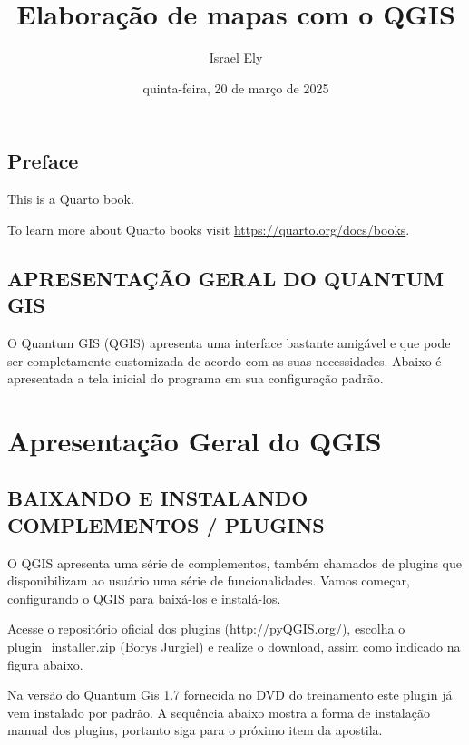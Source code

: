 \documentclass[
  11pt,
  a4paper,
]{book}
\title{Elaboração de mapas com o QGIS}
\author{Israel Ely}
\date{quinta-feira, 20 de março de 2025}
\renewcommand*\contentsname{Índice}
\newcommand\contentsname{Índice}
\begin{document}
\frontmatter
\maketitle

\renewcommand*\contentsname{Índice}
{
\hypersetup{linkcolor=}
\setcounter{tocdepth}{2}
\tableofcontents
}

\mainmatter
{}

\chapter*{Preface}\label{preface}


This is a Quarto book.

To learn more about Quarto books visit
\url{https://quarto.org/docs/books}.


\chapter{APRESENTAÇÃO GERAL DO QUANTUM
GIS}\label{apresentauxe7uxe3o-geral-do-quantum-gis}

O Quantum GIS (QGIS) apresenta uma interface bastante amigável e que
pode ser completamente customizada de acordo com as suas necessidades.
Abaixo é apresentada a tela inicial do programa em sua configuração
padrão.

\part{Apresentação Geral do QGIS}

\chapter{BAIXANDO E INSTALANDO COMPLEMENTOS /
PLUGINS}\label{baixando-e-instalando-complementos-plugins}

O QGIS apresenta uma série de complementos, também chamados de plugins
que disponibilizam ao usuário uma série de funcionalidades. Vamos
começar, configurando o QGIS para baixá-los e instalá-los.

Acesse o repositório oficial dos plugins (http://pyQGIS.org/), escolha o
plugin\_installer.zip (Borys Jurgiel) e realize o download, assim como
indicado na figura abaixo.

Na versão do Quantum Gis 1.7 fornecida no DVD do treinamento este plugin
já vem instalado por padrão. A sequência abaixo mostra a forma de
instalação manual dos plugins, portanto siga para o próximo item da
apostila.
\end{document}
